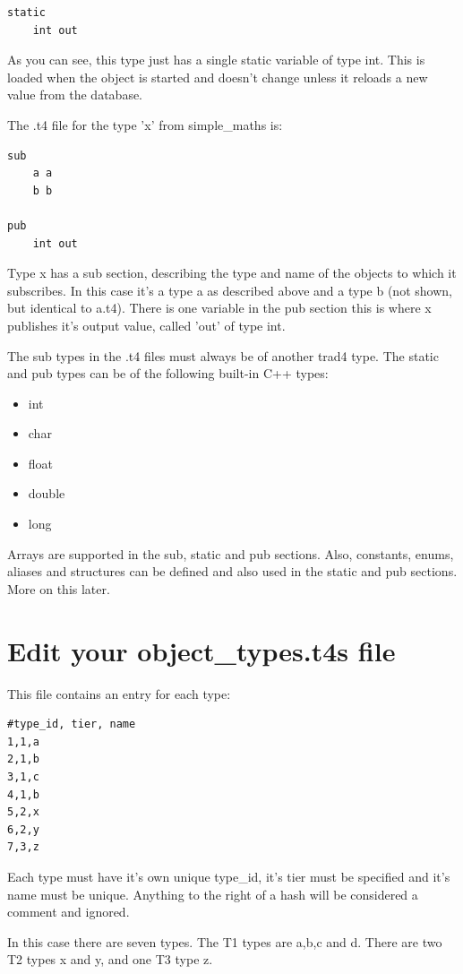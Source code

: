 \documentclass{report}
\begin{document}
\begin{verbatim}
static
    int out
\end{verbatim}

As you can see, this type just has a single static variable of type int. This is loaded when the object is started and doesn't change unless it reloads a new value from the database.

The .t4 file for the type 'x' from simple_maths is:

\begin{verbatim}
sub
    a a
    b b

pub 
    int out
\end{verbatim}

Type x has a sub section, describing the type and name of the objects to which it subscribes. In this case it's a type a as described above and a type b (not shown, but identical to a.t4). There is one variable in the pub section this is where x publishes it's output value, called 'out' of type int.

The sub types in the .t4 files must always be of another trad4 type. The static and pub types can be of the following built-in C++ types:

\begin{itemize}
\item int
\item char
\item float
\item double
\item long
\end{itemize}

Arrays are supported in the sub, static and pub sections. Also, constants, enums, aliases and structures can be defined and also used in the static and pub sections. More on this later.

\section{Edit your object_types.t4s file}

This file contains an entry for each type:
\begin{verbatim}
#type_id, tier, name
1,1,a
2,1,b
3,1,c
4,1,b
5,2,x
6,2,y
7,3,z
\end{verbatim}

Each type must have it's own unique type_id, it's tier must be specified and it's name must be unique. 
Anything to the right of a hash will be considered a comment and ignored.

In this case there are seven types. The T1 types are a,b,c and d. There are two T2 types x and y, and one T3 type z.
\end{document}
